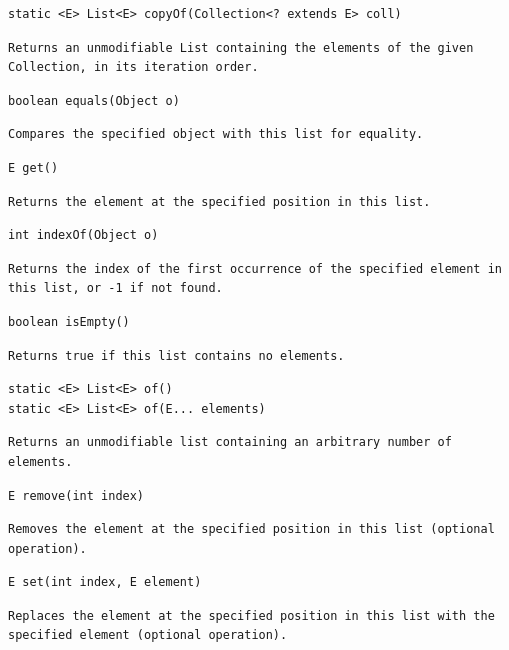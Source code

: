 \documentclass[5pt, portrait]{article}
\begin{document}
\begin{verbatim}
static <E> List<E> copyOf(Collection<? extends E> coll)
\end{verbatim}
\begin{verbatim}
Returns an unmodifiable List containing the elements of the given Collection, in its iteration order.
\end{verbatim}

\begin{verbatim}
boolean equals(Object o)
\end{verbatim}
\begin{verbatim}
Compares the specified object with this list for equality.
\end{verbatim}

\begin{verbatim}
E get()
\end{verbatim}
\begin{verbatim}
Returns the element at the specified position in this list.
\end{verbatim}

\begin{verbatim}
int indexOf(Object o)
\end{verbatim}
\begin{verbatim}
Returns the index of the first occurrence of the specified element in this list, or -1 if not found.
\end{verbatim}

\begin{verbatim}
boolean isEmpty()
\end{verbatim}
\begin{verbatim}
Returns true if this list contains no elements.
\end{verbatim}

\begin{verbatim}
static <E> List<E> of()
static <E> List<E> of(E... elements)
\end{verbatim}
\begin{verbatim}
Returns an unmodifiable list containing an arbitrary number of elements.
\end{verbatim}

\begin{verbatim}
E remove(int index)
\end{verbatim}
\begin{verbatim}
Removes the element at the specified position in this list (optional operation).
\end{verbatim}

\begin{verbatim}
E set(int index, E element)
\end{verbatim}
\begin{verbatim}
Replaces the element at the specified position in this list with the specified element (optional operation).
\end{verbatim}
\end{document}
